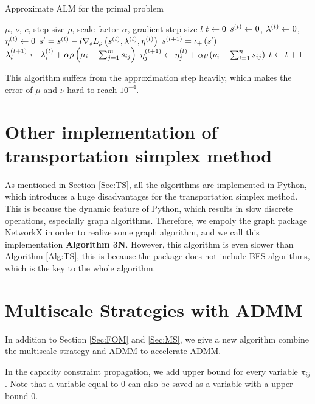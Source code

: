 \documentclass[english]{pkupaper}
\begin{document}
\begin{algorithm}
\caption{Approximate ALM for the primal problem}
\label{Alg:ApproxALM}
\begin{algorithmic}
\REQUIRE $\mu$, $\nu$, $c$, step size $\rho$, scale factor $\alpha$, gradient step size $l$
\STATE $ t \leftarrow 0 $
\STATE $ s^{\left( t \right)} \leftarrow 0 $, $ \lambda^{\left( t \right)} \leftarrow 0 $, $ \eta^{\left( t \right)} \leftarrow 0 $
\STATE $ s' = s^{\left( t \right)} - l \nabla_s L_{\rho} \left(  s^{\left( t \right)}, \lambda^{\left( t \right)}, \eta^{\left( t \right)}  \right) $
\STATE $ s^{\left(  t + 1  \right)} = \iota_+ \left( s' \right) $
\STATE $ \lambda^{\left(  t + 1  \right)}_i \leftarrow \lambda^{\left( t \right)}_i + \alpha \rho \left(  \mu_i - \sum_{ {j} = {1} }^{m}{s_{ i j }}  \right) $
\STATE $ \eta^{\left(  t + 1  \right)}_j \leftarrow \eta^{\left( t \right)}_j + \alpha \rho \left(  \nu_i - \sum_{ {i} = {1} }^{n}{s_{ i j }}  \right) $
\STATE $ t \leftarrow t + 1 $
\ENDWHILE
\end{algorithmic}
\end{algorithm}

This algorithm suffers from the approximation step heavily, which makes the error of $\mu$ and $\nu$ hard to reach $10^{-4}$.

\section{Other implementation of transportation simplex method}

As mentioned in Section \ref{Sec:TS}, all the algorithms are implemented in Python, which introduces a huge disadvantages for the transportation simplex method. This is because the dynamic feature of Python, which results in slow discrete operations, especially graph algorithms. Therefore, we empoly the graph package NetworkX in order to realize some graph algorithm, and we call this implementation \textbf{Algorithm \hypertarget{EAlg:3N}{3N}}. However, this algorithm is even slower than Algorithm \ref{Alg:TS}, this is because the package does not include BFS algorithms, which is the key to the whole algorithm.

\section{Multiscale Strategies with ADMM}

In addition to Section \ref{Sec:FOM} and \ref{Sec:MS}, we give a new algorithm combine the multiscale strategy and ADMM to accelerate ADMM.

In the capacity constraint propagation, we add upper bound for every variable $\pi_{ij}$. Note that a variable equal to $0$ can also be saved as a variable with a upper bound $0$.
\end{document}
